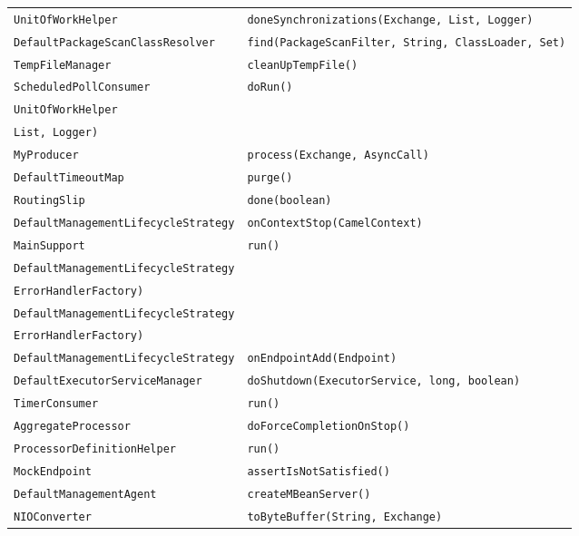 \begin{center}
\begin{longtable}{ll}
\lstinline/UnitOfWorkHelper/&{\lstinline/doneSynchronizations(Exchange, List, Logger)/}\\
\lstinline/DefaultPackageScanClassResolver/&{\lstinline/find(PackageScanFilter, String, ClassLoader, Set)/}\\
\lstinline/TempFileManager/&{\lstinline/cleanUpTempFile()/}\\
\lstinline/ScheduledPollConsumer/&{\lstinline/doRun()/}\\
\lstinline/UnitOfWorkHelper/&\raisebox{-13pt}{\shortstack{\lstinline/beforeRouteSynchronizations(Route, Exchange,/\\\lstinline/List, Logger)/}}\\
\lstinline/MyProducer/&{\lstinline/process(Exchange, AsyncCall)/}\\
\lstinline/DefaultTimeoutMap/&{\lstinline/purge()/}\\
\lstinline/RoutingSlip/&{\lstinline/done(boolean)/}\\
\lstinline/DefaultManagementLifecycleStrategy/&{\lstinline/onContextStop(CamelContext)/}\\
\lstinline/MainSupport/&{\lstinline/run()/}\\
\lstinline/DefaultManagementLifecycleStrategy/&\raisebox{-13pt}{\shortstack{\lstinline/onErrorHandlerRemove(RouteContext, Processor,/\\\lstinline/ErrorHandlerFactory)/}}\\
\lstinline/DefaultManagementLifecycleStrategy/&\raisebox{-13pt}{\shortstack{\lstinline/onErrorHandlerAdd(RouteContext, Processor,/\\\lstinline/ErrorHandlerFactory)/}}\\
\lstinline/DefaultManagementLifecycleStrategy/&{\lstinline/onEndpointAdd(Endpoint)/}\\
\lstinline/DefaultExecutorServiceManager/&{\lstinline/doShutdown(ExecutorService, long, boolean)/}\\
\lstinline/TimerConsumer/&{\lstinline/run()/}\\
\lstinline/AggregateProcessor/&{\lstinline/doForceCompletionOnStop()/}\\
\lstinline/ProcessorDefinitionHelper/&{\lstinline/run()/}\\
\lstinline/MockEndpoint/&{\lstinline/assertIsNotSatisfied()/}\\
\lstinline/DefaultManagementAgent/&{\lstinline/createMBeanServer()/}\\
\lstinline/NIOConverter/&{\lstinline/toByteBuffer(String, Exchange)/}\\

\end{longtable}
\end{center}

